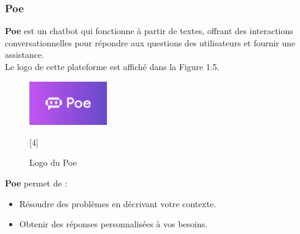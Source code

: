 \subsubsection{Poe}
    \textbf{Poe} est un chatbot qui fonctionne à partir de textes, offrant des interactions conversationnelles pour répondre aux questions des utilisateurs et fournir une assistance.\\
    Le logo de cette plateforme est affiché dans la Figure 1.5.
    \begin{figure}[H]
        \centering
        \includegraphics[width=0.3\textwidth,height=0.2\textwidth]{images/poe-logo.png}
        \caption{Logo du Poe}[4]
        \label{fig:poe-logo}
    \end{figure}
    \noindent \textbf{Poe} permet de :
        \begin{itemize}[itemsep=1pt, parsep=1pt]
            \item Résoudre des problèmes en décrivant votre contexte.
            \item Obtenir des réponses personnalisées à vos besoins.
        \end{itemize}

